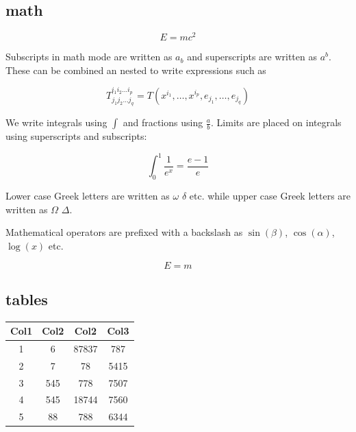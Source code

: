 \documentclass{article}
\begin{document}
\subsection{math}
$$E=mc^2$$

Subscripts in math mode are written as $a_b$ and superscripts are written as $a^b$. These can be combined an nested to write expressions such as

$$T^{i_1 i_2 \dots i_p}_{j_1 j_2 \dots j_q} = T(x^{i_1},\dots,x^{i_p},e_{j_1},\dots,e_{j_q})$$

We write integrals using $\int$ and fractions using $\frac{a}{b}$. Limits are placed on integrals using superscripts and subscripts:

$$\int_0^1 \frac{1}{e^x} =  \frac{e-1}{e}$$

Lower case Greek letters are written as $\omega$ $\delta$ etc. while upper case Greek letters are written as $\Omega$ $\Delta$.

Mathematical operators are prefixed with a backslash as $\sin(\beta)$, $\cos(\alpha)$, $\log(x)$ etc.

\begin{equation}
E=m
\end{equation}
\subsection{tables}
\begin{center}
    \begin{tabular}{||c c c c||} 
    \hline
    Col1 & Col2 & Col2 & Col3 \\ [0.5ex] 
    \hline\hline
    1 & 6 & 87837 & 787 \\ 
    \hline
    2 & 7 & 78 & 5415 \\
    \hline
    3 & 545 & 778 & 7507 \\
    \hline
    4 & 545 & 18744 & 7560 \\
    \hline
    5 & 88 & 788 & 6344 \\ [1ex] 
    \hline
   \end{tabular}
   \end{center}
\end{document}
